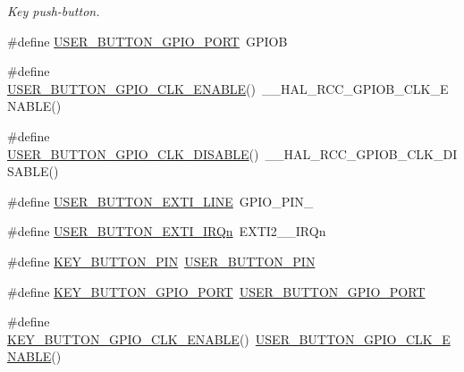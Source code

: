 \begin{DoxyCompactItemize}
\begin{DoxyCompactList}\small\item\em Key push-\/button. \end{DoxyCompactList}\item 
\#define \hyperlink{group__B-L072Z-LRWAN1__LOW__LEVEL__BUTTON_gae2e6fc2fdfda22b4eed3667375a8bd81}{U\+S\+E\+R\+\_\+\+B\+U\+T\+T\+O\+N\+\_\+\+G\+P\+I\+O\+\_\+\+P\+O\+RT}~G\+P\+I\+OB
\item 
\#define \hyperlink{group__B-L072Z-LRWAN1__LOW__LEVEL__BUTTON_gaa1f35ca26b42710d057661b54ace7d82}{U\+S\+E\+R\+\_\+\+B\+U\+T\+T\+O\+N\+\_\+\+G\+P\+I\+O\+\_\+\+C\+L\+K\+\_\+\+E\+N\+A\+B\+LE}()~\+\_\+\+\_\+\+H\+A\+L\+\_\+\+R\+C\+C\+\_\+\+G\+P\+I\+O\+B\+\_\+\+C\+L\+K\+\_\+\+E\+N\+A\+B\+LE()
\item 
\#define \hyperlink{group__B-L072Z-LRWAN1__LOW__LEVEL__BUTTON_ga71af1d1eec8f8b424b72f625abaad282}{U\+S\+E\+R\+\_\+\+B\+U\+T\+T\+O\+N\+\_\+\+G\+P\+I\+O\+\_\+\+C\+L\+K\+\_\+\+D\+I\+S\+A\+B\+LE}()~\+\_\+\+\_\+\+H\+A\+L\+\_\+\+R\+C\+C\+\_\+\+G\+P\+I\+O\+B\+\_\+\+C\+L\+K\+\_\+\+D\+I\+S\+A\+B\+LE()
\item 
\#define \hyperlink{group__B-L072Z-LRWAN1__LOW__LEVEL__BUTTON_gac41d04c2244ba780e4749991c85d1e9a}{U\+S\+E\+R\+\_\+\+B\+U\+T\+T\+O\+N\+\_\+\+E\+X\+T\+I\+\_\+\+L\+I\+NE}~G\+P\+I\+O\+\_\+\+P\+I\+N\+\_
\item 
\#define \hyperlink{group__B-L072Z-LRWAN1__LOW__LEVEL__BUTTON_ga2e6e65a053529869d1c370610825d98f}{U\+S\+E\+R\+\_\+\+B\+U\+T\+T\+O\+N\+\_\+\+E\+X\+T\+I\+\_\+\+I\+R\+Qn}~E\+X\+T\+I2\+\_\+\_\+\+I\+R\+Qn
\item 
\#define \hyperlink{group__B-L072Z-LRWAN1__LOW__LEVEL__BUTTON_ga5c260a4b4e26836dc3a9b6f15d317421}{K\+E\+Y\+\_\+\+B\+U\+T\+T\+O\+N\+\_\+\+P\+IN}~\hyperlink{group__B-L072Z-LRWAN1__LOW__LEVEL__BUTTON_ga34df6915e3013d6a0c74131d3946b659}{U\+S\+E\+R\+\_\+\+B\+U\+T\+T\+O\+N\+\_\+\+P\+IN}
\item 
\#define \hyperlink{group__B-L072Z-LRWAN1__LOW__LEVEL__BUTTON_ga98680733a6992dacef531bfd0c23031c}{K\+E\+Y\+\_\+\+B\+U\+T\+T\+O\+N\+\_\+\+G\+P\+I\+O\+\_\+\+P\+O\+RT}~\hyperlink{group__B-L072Z-LRWAN1__LOW__LEVEL__BUTTON_gae2e6fc2fdfda22b4eed3667375a8bd81}{U\+S\+E\+R\+\_\+\+B\+U\+T\+T\+O\+N\+\_\+\+G\+P\+I\+O\+\_\+\+P\+O\+RT}
\item 
\#define \hyperlink{group__B-L072Z-LRWAN1__LOW__LEVEL__BUTTON_ga6237d656da42b750f63cbf3e329096d5}{K\+E\+Y\+\_\+\+B\+U\+T\+T\+O\+N\+\_\+\+G\+P\+I\+O\+\_\+\+C\+L\+K\+\_\+\+E\+N\+A\+B\+LE}()~\hyperlink{group__B-L072Z-LRWAN1__LOW__LEVEL__BUTTON_gaa1f35ca26b42710d057661b54ace7d82}{U\+S\+E\+R\+\_\+\+B\+U\+T\+T\+O\+N\+\_\+\+G\+P\+I\+O\+\_\+\+C\+L\+K\+\_\+\+E\+N\+A\+B\+LE}()

\end{DoxyCompactItemize}
